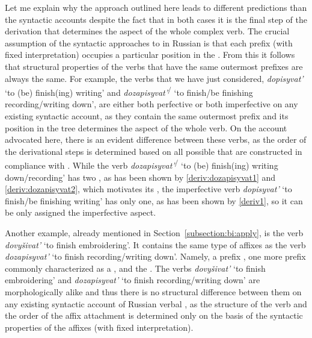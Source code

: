 Let me explain why the approach outlined here leads to different predictions than the syntactic accounts despite the fact that in both cases it is the final step of the derivation that determines the aspect of the whole complex verb. The crucial assumption of the syntactic approaches to  in Russian is that each prefix (with fixed interpretation) occupies a particular position in the . From this it follows that structural properties of the verbs that have the same outermost prefixes are always the same. For example, the verbs that we have just considered, \textit{dopisyvat'}\textsuperscript{\IPF} `to (be) finish(ing) writing' and \textit{dozapisyvat'}\textsuperscript{\IPF\slash\PF} `to finish/be finishing recording/writing down', are either both perfective or both imperfective on any existing syntactic  account, as they contain the same outermost prefix  and its position in the tree determines the aspect of the whole verb. On the account advocated here, there is an evident difference between these verbs, as the order of the derivational steps is determined based on all possible  that are constructed in compliance with . While the verb \textit{dozapisyvat'}\textsuperscript{\IPF\slash\PF} `to (be) finish(ing) writing down/recording' has two , as has been shown by \ref{deriv:dozapisyvat1} and \ref{deriv:dozapisyvat2}, which motivates its , the imperfective verb \textit{dopisyvat'}\textsuperscript{\IPF} `to finish/be finishing writing' has only one, as has been shown by \ref{deriv1}, so it can be only assigned the imperfective aspect.

Another example, already mentioned in Section~\ref{subsection:bi:apply}, is the verb \textit{dovy\v{s}ivat'} `to finish embroidering'. It contains the same type of affixes as the verb \textit{dozapisyvat'} `to finish recording/writing down'. Namely, a  prefix , one more prefix commonly characterized as a , and the . The verbs \textit{dovy\v{s}ivat'} `to finish embroidering' and \textit{dozapisyvat'} `to finish recording/writing down' are morphologically alike and thus there is no structural difference between them on any existing syntactic account of Russian verbal , as the structure of the verb and the order of the affix attachment is determined only on the basis of the syntactic properties of the affixes (with fixed interpretation).
 
